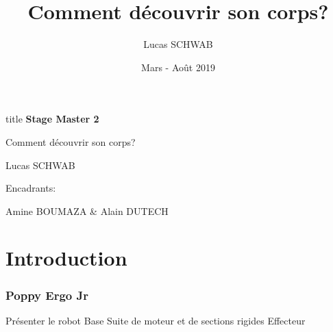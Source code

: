 \documentclass[french]{beamer}
\title{Comment découvrir son corps?}
\author{Lucas SCHWAB}
\date{Mars - Août 2019}
\begin{document}
\begin{frame}
    \begin{center}
        \begin{beamercolorbox}[sep=8pt,center]{title}
            \Huge \textbf{Stage Master 2}

            \huge Comment découvrir son corps?
        \end{beamercolorbox}
        \vfill
        
        Lucas SCHWAB

        \vfill

        Encadrants:

        Amine BOUMAZA
        \&
        Alain DUTECH
    \end{center}
\end{frame}


\begin{frame}
    \tableofcontents
\end{frame}

\section{Introduction}

\begin{frame}
    \frametitle{Poppy Ergo Jr}
    Présenter le robot
    Base
    Suite de moteur et de sections rigides
    Effecteur
\end{frame}






















\end{document}

